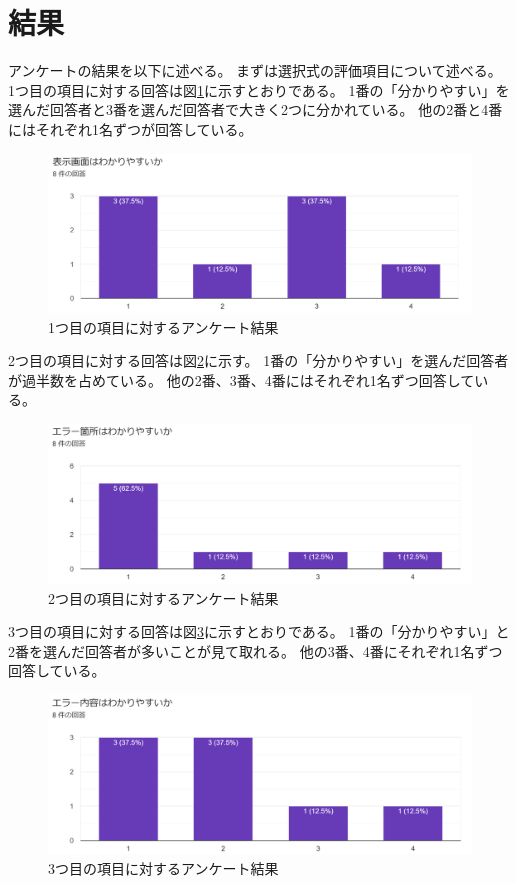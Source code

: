 \documentclass{csspaper}
\begin{document}
      \section{結果}

      アンケートの結果を以下に述べる。
      まずは選択式の評価項目について述べる。
      1つ目の項目に対する回答は図\ref{fig:que1}に示すとおりである。
      1番の「分かりやすい」を選んだ回答者と3番を選んだ回答者で大きく2つに分かれている。
      他の2番と4番にはそれぞれ1名ずつが回答している。

      \begin{figure}[htbp]
         \centering
         \includegraphics[width=12cm]{question1.png}
         \caption{1つ目の項目に対するアンケート結果}
         \label{fig:que1}
      \end{figure}

      2つ目の項目に対する回答は図\ref{fig:que2}に示す。
      1番の「分かりやすい」を選んだ回答者が過半数を占めている。
      他の2番、3番、4番にはそれぞれ1名ずつ回答している。

      \begin{figure}[htbp]
         \centering
         \includegraphics[width=12cm]{question2.png}
         \caption{2つ目の項目に対するアンケート結果}
         \label{fig:que2}
      \end{figure}

      3つ目の項目に対する回答は図\ref{fig:que3}に示すとおりである。
      1番の「分かりやすい」と2番を選んだ回答者が多いことが見て取れる。
      他の3番、4番にそれぞれ1名ずつ回答している。

      \begin{figure}[htbp]
         \centering
         \includegraphics[width=12cm]{question3.png}
         \caption{3つ目の項目に対するアンケート結果}
         \label{fig:que3}
      \end{figure}
\end{document}
